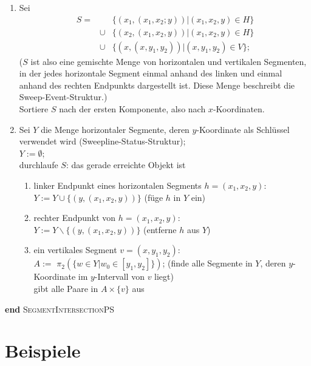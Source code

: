 \documentclass{scrreprt}%
\theoremstyle{break}
\begin{document}
\begin{enumerate}
\item
Sei \begin{displaymath}
  \begin{array}{rcl}
  S =&& \{(x_1, (x_1,x_2;y)) | (x_1,x_2,y)\in H\}\\
  &\cup& \{(x_2,(x_1,x_2,y)) | (x_1,x_2,y)\in H\}\\
  &\cup& \{(x,(x,y_1,y_2)) | (x,y_1,y_2)\in V\};
\end{array}
\end{displaymath}
($S$ ist also eine gemischte Menge von horizontalen und vertikalen Segmenten,
in der jedes horizontale Segment einmal anhand des linken und einmal
anhand des rechten Endpunkts dargestellt ist. Diese Menge beschreibt die
Sweep-Event-Struktur.)\\
Sortiere $S$ nach der ersten Komponente, also nach $x$-Koordinaten.

\item
Sei $Y$ die Menge horizontaler Segmente, deren $y$-Koordinate als
Schlüssel verwendet wird (Sweepline-Status-Struktur);\\
$Y:=\emptyset$;\\
durchlaufe $S$: das gerade erreichte Objekt ist
\begin{enumerate}
\item
linker Endpunkt eines horizontalen Segments $h=(x_1,x_2,y)$:\\
$Y := Y \cup \{(y,(x_1,x_2,y))\}$ (füge $h$ in $Y$ ein)
\item
rechter Endpunkt von $h=(x_1,x_2,y)$:\\
$Y := Y \backslash \{(y,(x_1,x_2,y))\}$ (entferne $h$ aus $Y$)
\item
ein vertikales Segment $v=(x,y_1,y_2)$:\\
$A :=$ 
$\pi_2 (\{w\in Y | w_0 \in [y_1,y_2] \})$;
 \hspace{1cm}  (finde alle Segmente in $Y$, deren
   $y$-Koordinate im $y$-Intervall von $v$ liegt)\\
gibt alle Paare in $A\times\{v\}$ aus
\end{enumerate}
\end{enumerate}
\textbf{end} \textsc{SegmentIntersectionPS} 

\chapter{Beispiele}
\end{document}
